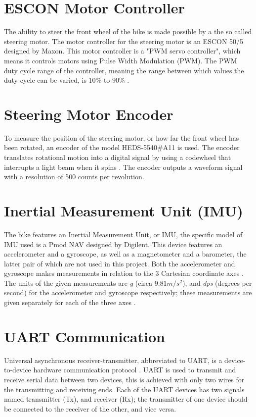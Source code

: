 \section{ESCON Motor Controller}
The ability to steer the front wheel of the bike is made possible by a the so called steering motor. The motor controller for the steering motor is an ESCON 50/5 designed by Maxon. This motor controller is a "PWM servo controller", which means it controls motors using Pulse Width Modulation (PWM). The PWM duty cycle range of the controller, meaning the range between which values the duty cycle can be varied, is 10\% to 90\% \cite{Maxon2021ESCONReference}.

\section{Steering Motor Encoder} \label{theory:encoder}
To measure the position of the steering motor, or how far the front wheel has been rotated, an encoder of the model HEDS-5540\#A11 is used. The encoder translates rotational motion into a digital signal by using a codewheel that interrupts a light beam when it spins \cite{AvagoTechnologies2014HEDM-55xx/560xHEDS-55xx/56xx}. The encoder outputs a waveform signal with a resolution of 500 counts per revolution.

\section{Inertial Measurement Unit (IMU)}
The bike features an Inertial Measurement Unit, or IMU, the specific model of IMU used is a Pmod NAV designed by Digilent. This device features an accelerometer and a gyroscope, as well as a magnetometer and a barometer, the latter pair of which are not used in this project. Both the accelerometer and gyroscope makes measurements in relation to the 3 Cartesian coordinate axes \cite{Digilent2017PmodManual}. The units of the given measurements are \textit{g} (circa $9.81 m/s^2$), and \textit{dps} (degrees per second) for the accelerometer and gyroscope respectively; these measurements are given separately for each of the three axes \cite{STMicroelectronics2015INEMOMagnetometer}.

\section{UART Communication}
Universal asynchronous receiver-transmitter, abbreviated to UART, is a device-to-device hardware communication protocol \cite{GraceLegaspi2020UART:Receiver/Transmitter}. UART is used to transmit and receive serial data between two devices, this is achieved with only two wires for the transmitting and receiving ends. Each of the UART devices has two signals named transmitter (Tx), and receiver (Rx); the transmitter of one device should be connected to the receiver of the other, and vice versa.

